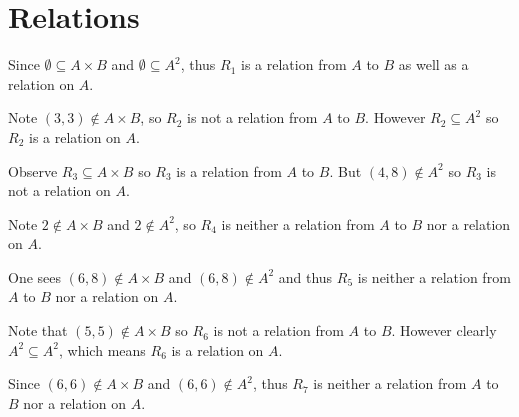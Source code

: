 \section{Relations}
\begin{questions}
    \item \begin{partquestions}{\alph*}
        \item Since $\emptyset \subseteq A\times B$ and $\emptyset \subseteq A^2$, thus $R_1$ is a relation from $A$ to $B$ as well as a relation on $A$.
        \item Note $(3, 3) \notin A\times B$, so $R_2$ is not a relation from $A$ to $B$. However $R_2 \subseteq A^2$ so $R_2$ is a relation on $A$.
        \item Observe $R_3 \subseteq A\times B$ so $R_3$ is a relation from $A$ to $B$. But $(4, 8) \notin A^2$ so $R_3$ is not a relation on $A$.
        \item Note $2 \notin A \times B$ and $2 \notin A^2$, so $R_4$ is neither a relation from $A$ to $B$ nor a relation on $A$.
        \item One sees $(6, 8) \notin A\times B$ and $(6, 8) \notin A^2$ and thus $R_5$ is neither a relation from $A$ to $B$ nor a relation on $A$.
        \item Note that $(5, 5) \notin A \times B$ so $R_6$ is not a relation from $A$ to $B$. However clearly $A^2 \subseteq A^2$, which means $R_6$ is a relation on $A$.
        \item Since $(6, 6) \notin A \times B$ and $(6, 6) \notin A^2$, thus $R_7$ is neither a relation from $A$ to $B$ nor a relation on $A$.
    \end{partquestions}
\end{questions}
